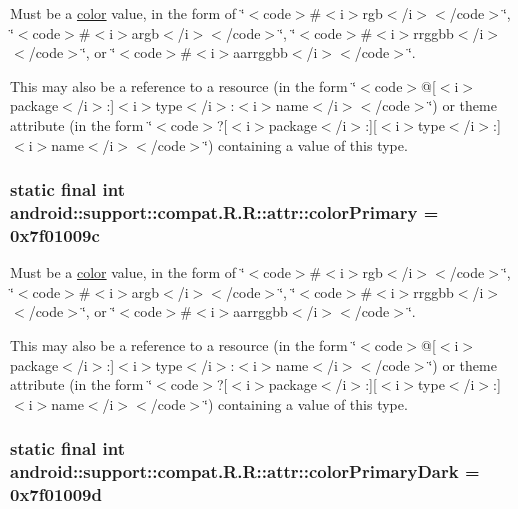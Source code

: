 Must be a \hyperlink{classandroid_1_1support_1_1compat_1_1_r_1_1color}{color} value, in the form of \char`\"{}$<$code$>$\#$<$i$>$rgb$<$/i$>$$<$/code$>$\char`\"{}, \char`\"{}$<$code$>$\#$<$i$>$argb$<$/i$>$$<$/code$>$\char`\"{}, \char`\"{}$<$code$>$\#$<$i$>$rrggbb$<$/i$>$$<$/code$>$\char`\"{}, or \char`\"{}$<$code$>$\#$<$i$>$aarrggbb$<$/i$>$$<$/code$>$\char`\"{}. 

This may also be a reference to a resource (in the form \char`\"{}$<$code$>$@\mbox{[}$<$i$>$package$<$/i$>$:\mbox{]}$<$i$>$type$<$/i$>$:$<$i$>$name$<$/i$>$$<$/code$>$\char`\"{}) or theme attribute (in the form \char`\"{}$<$code$>$?\mbox{[}$<$i$>$package$<$/i$>$:\mbox{]}\mbox{[}$<$i$>$type$<$/i$>$:\mbox{]}$<$i$>$name$<$/i$>$$<$/code$>$\char`\"{}) containing a value of this type. \hypertarget{classandroid_1_1support_1_1compat_1_1_r_1_1attr_a1ef5b496f7cdf8d10c7df27472a05a2}{
\subsubsection[{colorPrimary}]{\setlength{\rightskip}{0pt plus 5cm}static final int android::support::compat.R.R::attr::colorPrimary = 0x7f01009c}}
\label{classandroid_1_1support_1_1compat_1_1_r_1_1attr_a1ef5b496f7cdf8d10c7df27472a05a2}


Must be a \hyperlink{classandroid_1_1support_1_1compat_1_1_r_1_1color}{color} value, in the form of \char`\"{}$<$code$>$\#$<$i$>$rgb$<$/i$>$$<$/code$>$\char`\"{}, \char`\"{}$<$code$>$\#$<$i$>$argb$<$/i$>$$<$/code$>$\char`\"{}, \char`\"{}$<$code$>$\#$<$i$>$rrggbb$<$/i$>$$<$/code$>$\char`\"{}, or \char`\"{}$<$code$>$\#$<$i$>$aarrggbb$<$/i$>$$<$/code$>$\char`\"{}. 

This may also be a reference to a resource (in the form \char`\"{}$<$code$>$@\mbox{[}$<$i$>$package$<$/i$>$:\mbox{]}$<$i$>$type$<$/i$>$:$<$i$>$name$<$/i$>$$<$/code$>$\char`\"{}) or theme attribute (in the form \char`\"{}$<$code$>$?\mbox{[}$<$i$>$package$<$/i$>$:\mbox{]}\mbox{[}$<$i$>$type$<$/i$>$:\mbox{]}$<$i$>$name$<$/i$>$$<$/code$>$\char`\"{}) containing a value of this type. \hypertarget{classandroid_1_1support_1_1compat_1_1_r_1_1attr_f3d31d024e104452a9de28d073df95da}{
\subsubsection[{colorPrimaryDark}]{\setlength{\rightskip}{0pt plus 5cm}static final int android::support::compat.R.R::attr::colorPrimaryDark = 0x7f01009d}}
\label{classandroid_1_1support_1_1compat_1_1_r_1_1attr_f3d31d024e104452a9de28d073df95da}


